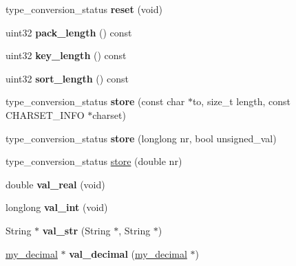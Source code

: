\begin{DoxyCompactItemize}
type\+\_\+conversion\+\_\+status {\bfseries reset} (void)
\item 
\mbox{\label{classField__varstring_a264f9e50ffb974ff47871eb803b2c4dd}} 
uint32 {\bfseries pack\+\_\+length} () const
\item 
\mbox{\label{classField__varstring_a9645a7eb6a57a9ba72e65bb913a52724}} 
uint32 {\bfseries key\+\_\+length} () const
\item 
\mbox{\label{classField__varstring_adf97e8e751a379659c2ffadab80117db}} 
uint32 {\bfseries sort\+\_\+length} () const
\item 
\mbox{\label{classField__varstring_a4da8d92e858d3325d13a73c69e87bebb}} 
type\+\_\+conversion\+\_\+status {\bfseries store} (const char $\ast$to, size\+\_\+t length, const C\+H\+A\+R\+S\+E\+T\+\_\+\+I\+N\+FO $\ast$charset)
\item 
\mbox{\label{classField__varstring_a3dc54f569ffe8f9bc888a85114ee88c4}} 
type\+\_\+conversion\+\_\+status {\bfseries store} (longlong nr, bool unsigned\+\_\+val)
\item 
type\+\_\+conversion\+\_\+status \mbox{\hyperlink{classField__varstring_ad54d8ec0e88d58ffde65168643155434}{store}} (double nr)
\item 
\mbox{\label{classField__varstring_ac64cd34ee0faf8a34d7867de788a9167}} 
double {\bfseries val\+\_\+real} (void)
\item 
\mbox{\label{classField__varstring_a947d187ac35769fc78a7b248d838471e}} 
longlong {\bfseries val\+\_\+int} (void)
\item 
\mbox{\label{classField__varstring_a56be4df4fd9ec8fda4c2945b8ff3f38f}} 
String $\ast$ {\bfseries val\+\_\+str} (String $\ast$, String $\ast$)
\item 
\mbox{\label{classField__varstring_a7c0d1df466af2e6e011b389a0f1eadd9}} 
\mbox{\hyperlink{classmy__decimal}{my\+\_\+decimal}} $\ast$ {\bfseries val\+\_\+decimal} (\mbox{\hyperlink{classmy__decimal}{my\+\_\+decimal}} $\ast$)
\item 

\end{DoxyCompactItemize}
